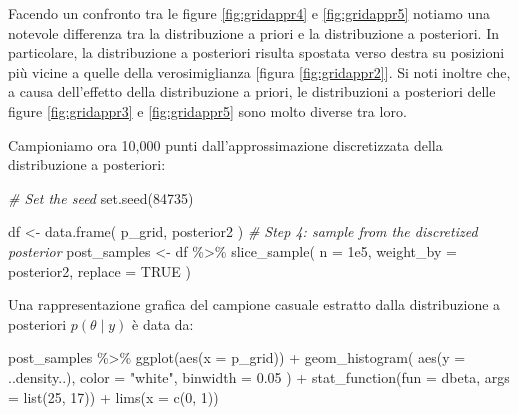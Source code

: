 \documentclass[
  11pt,
]{krantz}
\makeatletter
\newenvironment{Shaded}{\begin{snugshade}}{\end{snugshade}}
\newcommand{\AttributeTok}[1]{\textcolor[rgb]{0.61,0.61,0.61}{#1}}
\newcommand{\CommentTok}[1]{\textcolor[rgb]{0.37,0.37,0.37}{\textit{#1}}}
\newcommand{\ConstantTok}[1]{\textcolor[rgb]{0,0,0}{#1}}
\newcommand{\DecValTok}[1]{\textcolor[rgb]{0.06,0.06,0.06}{#1}}
\newcommand{\FloatTok}[1]{\textcolor[rgb]{0.06,0.06,0.06}{#1}}
\newcommand{\FunctionTok}[1]{\textcolor[rgb]{0,0,0}{#1}}
\newcommand{\NormalTok}[1]{#1}
\newcommand{\OtherTok}[1]{\textcolor[rgb]{0.37,0.37,0.37}{#1}}
\newcommand{\SpecialCharTok}[1]{\textcolor[rgb]{0,0,0}{#1}}
\newcommand{\StringTok}[1]{\textcolor[rgb]{0.5,0.5,0.5}{#1}}
\newenvironment{kframe}{%
\medskip{}
\setlength{\fboxsep}{.8em}
 \def\at@end@of@kframe{}%
 \ifinner\ifhmode%
  \def\at@end@of@kframe{\end{minipage}}%
  \begin{minipage}{\columnwidth}%
 \fi\fi%
 \def\FrameCommand##1{\hskip\@totalleftmargin \hskip-\fboxsep
 \colorbox{shadecolor}{##1}\hskip-\fboxsep
     \hskip-\linewidth \hskip-\@totalleftmargin \hskip\columnwidth}%
 \MakeFramed {\advance\hsize-\width
   \@totalleftmargin\z@ \linewidth\hsize
   \@setminipage}}%
 {\par\unskip\endMakeFramed%
 \at@end@of@kframe}
\renewenvironment{Shaded}{\begin{kframe}}{\end{kframe}}
\theoremstyle{definition}
\theoremstyle{definition}
\theoremstyle{definition}
\theoremstyle{definition}
\theoremstyle{remark}
\makeatother
\begin{document}
Facendo un confronto tra le figure \ref{fig:gridappr4} e \ref{fig:gridappr5} notiamo una notevole differenza tra la distribuzione a priori e la distribuzione a posteriori. In particolare, la distribuzione a posteriori risulta spostata verso destra su posizioni più vicine a quelle della verosimiglianza {[}figura \ref{fig:gridappr2}{]}. Si noti inoltre che, a causa dell'effetto della distribuzione a priori, le distribuzioni a posteriori delle figure \ref{fig:gridappr3} e \ref{fig:gridappr5} sono molto diverse tra loro.

Campioniamo ora 10,000 punti dall'approssimazione discretizzata della distribuzione a posteriori:

\begin{Shaded}
\begin{Highlighting}[]
\CommentTok{\# Set the seed}
\FunctionTok{set.seed}\NormalTok{(}\DecValTok{84735}\NormalTok{)}

\NormalTok{df }\OtherTok{\textless{}{-}} \FunctionTok{data.frame}\NormalTok{(}
\NormalTok{  p\_grid,}
\NormalTok{  posterior2}
\NormalTok{)}
\CommentTok{\# Step 4: sample from the discretized posterior}
\NormalTok{post\_samples }\OtherTok{\textless{}{-}}\NormalTok{ df }\SpecialCharTok{\%\textgreater{}\%}
  \FunctionTok{slice\_sample}\NormalTok{(}
  \AttributeTok{n =} \FloatTok{1e5}\NormalTok{,}
  \AttributeTok{weight\_by =}\NormalTok{ posterior2,}
  \AttributeTok{replace =} \ConstantTok{TRUE}
\NormalTok{)}
\end{Highlighting}
\end{Shaded}

\noindent Una rappresentazione grafica del campione casuale estratto dalla distribuzione a posteriori \(p(\theta \mid y)\) è data da:

\begin{Shaded}
\begin{Highlighting}[]
\NormalTok{post\_samples }\SpecialCharTok{\%\textgreater{}\%}
  \FunctionTok{ggplot}\NormalTok{(}\FunctionTok{aes}\NormalTok{(}\AttributeTok{x =}\NormalTok{ p\_grid)) }\SpecialCharTok{+}
  \FunctionTok{geom\_histogram}\NormalTok{(}
    \FunctionTok{aes}\NormalTok{(}\AttributeTok{y =}\NormalTok{ ..density..), }
    \AttributeTok{color =} \StringTok{"white"}\NormalTok{, }
    \AttributeTok{binwidth =} \FloatTok{0.05}
\NormalTok{  ) }\SpecialCharTok{+}
  \FunctionTok{stat\_function}\NormalTok{(}\AttributeTok{fun =}\NormalTok{ dbeta, }\AttributeTok{args =} \FunctionTok{list}\NormalTok{(}\DecValTok{25}\NormalTok{, }\DecValTok{17}\NormalTok{)) }\SpecialCharTok{+}
  \FunctionTok{lims}\NormalTok{(}\AttributeTok{x =} \FunctionTok{c}\NormalTok{(}\DecValTok{0}\NormalTok{, }\DecValTok{1}\NormalTok{))}
\end{Highlighting}
\end{Shaded}
\end{document}
